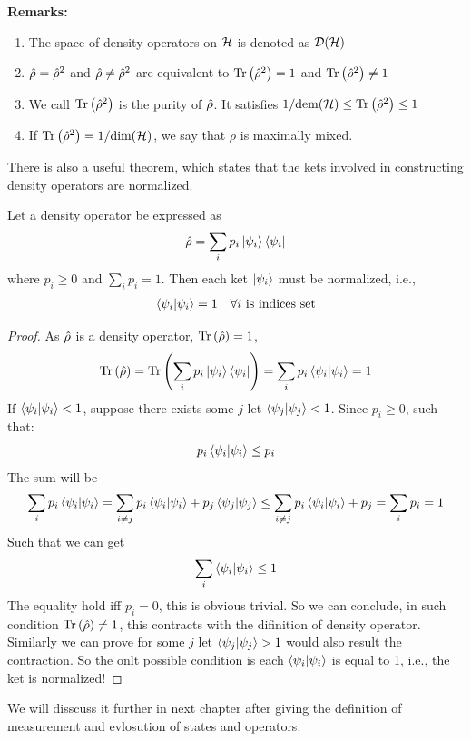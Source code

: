 \begin{tcolorbox}{\textbf{Remarks:}}
    \begin{enumerate}
        \item The space of density operators on $\mathcal{H}$ is denoted as $\mathcal{D} (\mathcal{H})$ 
        \item $\hat{\rho} = \hat{\rho}^2$ and $\hat{\rho} \neq \hat{\rho}^2$ are equivalent to $\mathrm{Tr}\left( \hat{\rho}^2 \right) =1$ and $\mathrm{Tr}\left( \hat{\rho}^2 \right) \neq 1$ 
        \item We call $\mathrm{Tr}\left( \hat{\rho}^2 \right)$ is the purity of $\hat{\rho}$. It satisfies $1/\mathrm{dem}(\mathcal{H}) \leq \mathrm{Tr}\left( \hat{\rho}^2 \right) \leq 1 $
        \item If $\mathrm{Tr}\left( \hat{\rho}^2 \right) = 1/ \text{dim}(\mathrm{\mathcal{H}})$, we say that $\rho$ is maximally mixed. 
    \end{enumerate}
\end{tcolorbox}
There is also a useful theorem, which states that the kets involved in constructing density operators are normalized.
\begin{theorem}
    Let a density operator be expressed as
    \begin{eqnarray}
        \hat{\rho} = \sum_i p_i \ket{\psi_i} \bra{\psi_i}
    \end{eqnarray}
    where $p_i \geq 0$ and $\sum_i p_i = 1$. Then each ket $\ket{\psi_i}$ must be normalized, i.e., 
    \begin{eqnarray}
        \braket{\psi_i|\psi_i} = 1 \quad \forall i \text{ is indices set}
    \end{eqnarray}
\end{theorem}
\begin{proof}
    As $\hat{\rho}$ is a density operator, $\mathrm{Tr}\left( \hat{\rho} \right)=1$, 
    \begin{eqnarray}
        \mathrm{Tr}\left(  \hat{\rho} \right) = \mathrm{Tr}\left( \sum_{i} p_i \ket{\psi_i} \bra{\psi_i}  \right) = \sum_i p_i \braket{\psi_i|\psi_i} = 1
    \end{eqnarray}
    If $\braket{\psi_i|\psi_i} < 1$, suppose there exists some $j$ let $\braket{\psi_j|\psi_j}<1$. Since $p_i \geq 0$, such that: 
    \begin{eqnarray}
        p_i \braket{\psi_i|\psi_i} \leq p_i
    \end{eqnarray}
    The sum will be 
    \begin{eqnarray}
        \sum_i p_i \braket{\psi_i|\psi_i} = \sum_{i \neq j} p_i\braket{\psi_i|\psi_i} + p_j \braket{\psi_j|\psi_j} \leq \sum_{i \neq j} p_i\braket{\psi_i|\psi_i} + p_j = \sum_i p_i = 1
    \end{eqnarray}
    Such that we can get 
    \begin{eqnarray}
        \sum_i \braket{\psi_i|\psi_i} \leq 1
    \end{eqnarray}
    The equality hold iff $p_i = 0$, this is obvious trivial. So we can conclude, in such condition $\mathrm{Tr}\left( \hat{\rho} \right) \neq 1$, this contracts with the difinition of density operator. Similarly we can prove for some $j$ let $\braket{\psi_j|\psi_j} > 1$ would also result the contraction. So the onlt possible condition is each $\braket{\psi_i|\psi_i}$ is equal to 1, i.e., the ket is normalized!
\end{proof}
We will disscuss it further in next chapter after giving the definition of measurement and evlosution of states and operators.
\newpage
